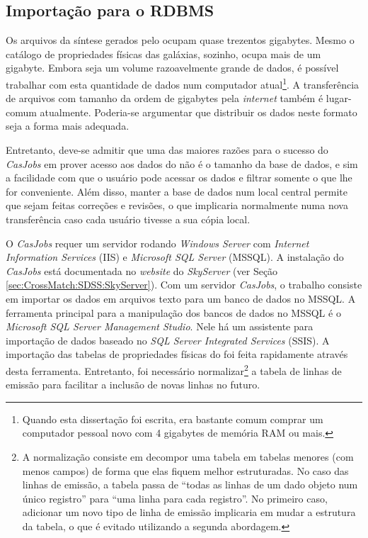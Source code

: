 \subsection{Importação para o RDBMS}

Os arquivos da síntese gerados pelo \starlight ocupam quase trezentos gigabytes.
Mesmo o catálogo de propriedades físicas das galáxias, sozinho, ocupa mais de um
gigabyte. Embora seja um volume razoavelmente grande de dados, é possível
trabalhar com esta quantidade de dados num computador atual\footnote{Quando esta
dissertação foi escrita, era bastante comum comprar um computador pessoal novo
com 4 gigabytes de memória RAM ou mais.}. A transferência de arquivos com
tamanho da ordem de gigabytes pela {\em internet} também é lugar-comum
atualmente. Poderia-se argumentar que distribuir os dados neste formato seja a
forma mais adequada.

Entretanto, deve-se admitir que uma das maiores razões para o sucesso do {\em
CasJobs} em prover acesso aos dados do \SDSS não é o tamanho da base de dados, e
sim a facilidade com que o usuário pode acessar os dados e filtrar somente o que
lhe for conveniente. Além disso, manter a base de dados num local central
permite que sejam feitas correções e revisões, o que implicaria normalmente numa
nova transferência caso cada usuário tivesse a sua cópia local.

O {\em CasJobs} requer um servidor rodando {\em Windows Server} com {\em
Internet Information Services} (IIS) e {\em Microsoft SQL Server} (MSSQL). A
instalação do {\em CasJobs} está documentada no {\em website} do {\em SkyServer}
(ver Seção \ref{sec:CrossMatch:SDSS:SkyServer}). Com um servidor {\em CasJobs},
o trabalho consiste em importar os dados em arquivos texto para um banco de
dados no MSSQL. A ferramenta principal para a manipulação dos bancos de dados no
MSSQL é o {\em Microsoft SQL Server Management Studio}. Nele há um assistente
para importação de dados baseado no {\em SQL Server Integrated Services} (SSIS).
A importação das tabelas de propriedades físicas do \starlight foi feita
rapidamente através desta ferramenta. Entretanto, foi necessário
normalizar\footnote{A normalização consiste em decompor uma tabela em tabelas
menores (com menos campos) de forma que elas fiquem melhor estruturadas. No caso
das linhas de emissão, a tabela passa de ``todas as linhas de um dado objeto num
único registro'' para ``uma linha para cada registro''. No primeiro caso,
adicionar um novo tipo de linha de emissão implicaria em mudar a estrutura da
tabela, o que é evitado utilizando a segunda abordagem.} a tabela de linhas de
emissão para facilitar a inclusão de novas linhas no futuro.

